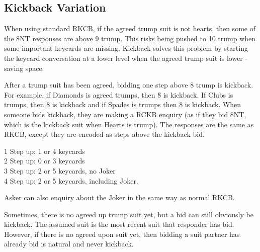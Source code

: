 \documentclass[a4paper]{JoshCards}
\begin{document}
\subsection*{Kickback Variation}

When using standard RKCB, if the agreed trump suit is not hearts, then some of the 8NT responses are above 9 trump. This risks being pushed to 10 trump when some important keycards are missing. Kickback solves this problem by starting the keycard conversation at a lower level when the agreed trump suit is lower - saving space. 

After a trump suit has been agreed, bidding one step above 8 trump is kickback. For example, if Diamonds is agreed trumps, then {8\H} is kickback. If Clubs is trumps, then {8\D} is kickback and if Spades is trumps then {8\C} is kickback. When someone bids kickback, they are making a RCKB enquiry (as if they bid 8NT, which is the kickback suit when Hearts is trump). The responses are the same as RKCB, except they are encoded as steps above the kickback bid.

1 Step up: 1 or 4 keycards\\
2 Step up: 0 or 3 keycards\\
3 Step up: 2 or 5 keycards, no Joker\\ 
4 Step up: 2 or 5 keycards, including Joker.

Asker can also enquiry about the Joker in the same way as normal RKCB.

Sometimes, there is no agreed up trump suit yet, but a bid can still obviously be kickback. The assumed suit is the most recent suit that responder has bid. However, if there is no agreed upon suit yet, then bidding a suit partner has already bid is natural  and never kickback.


\end{document}
